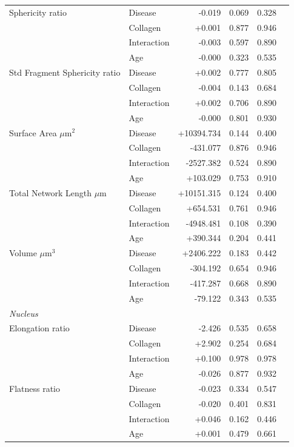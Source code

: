\documentclass[11pt,a4paper]{article}
\begin{document}
\begin{longtable}{llrrrr}
  Sphericity ratio & Disease & -0.019 & 0.069 & 0.328 &  \\
   & Collagen & +0.001 & 0.877 & 0.946 &  \\
   & Interaction & -0.003 & 0.597 & 0.890 &  \\
   & Age & -0.000 & 0.323 & 0.535 &  \\
  Std Fragment Sphericity ratio & Disease & +0.002 & 0.777 & 0.805 &  \\
   & Collagen & -0.004 & 0.143 & 0.684 &  \\
   & Interaction & +0.002 & 0.706 & 0.890 &  \\
   & Age & -0.000 & 0.801 & 0.930 &  \\
  Surface Area $\mu$m$^{2}$ & Disease & +10394.734 & 0.144 & 0.400 &  \\
   & Collagen & -431.077 & 0.876 & 0.946 &  \\
   & Interaction & -2527.382 & 0.524 & 0.890 &  \\
   & Age & +103.029 & 0.753 & 0.910 &  \\
  Total Network Length $\mu$m & Disease & +10151.315 & 0.124 & 0.400 &  \\
   & Collagen & +654.531 & 0.761 & 0.946 &  \\
   & Interaction & -4948.481 & 0.108 & 0.390 &  \\
   & Age & +390.344 & 0.204 & 0.441 &  \\
  Volume $\mu$m$^{3}$ & Disease & +2406.222 & 0.183 & 0.442 &  \\
   & Collagen & -304.192 & 0.654 & 0.946 &  \\
   & Interaction & -417.287 & 0.668 & 0.890 &  \\
   & Age & -79.122 & 0.343 & 0.535 &  \\
\midrule
\multicolumn{6}{l}{\textit{Nucleus}} \\
  Elongation ratio & Disease & -2.426 & 0.535 & 0.658 &  \\
   & Collagen & +2.902 & 0.254 & 0.684 &  \\
   & Interaction & +0.100 & 0.978 & 0.978 &  \\
   & Age & -0.026 & 0.877 & 0.932 &  \\
  Flatness ratio & Disease & -0.023 & 0.334 & 0.547 &  \\
   & Collagen & -0.020 & 0.401 & 0.831 &  \\
   & Interaction & +0.046 & 0.162 & 0.446 &  \\
   & Age & +0.001 & 0.479 & 0.661 &  \\

\end{longtable}
\end{document}
